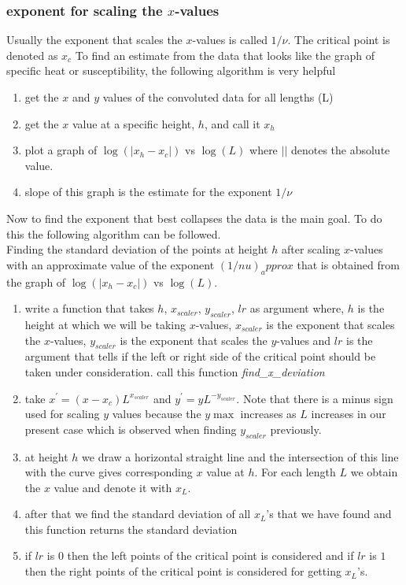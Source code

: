 		\subsubsection{exponent for scaling the $x$-values}
		Usually the exponent that scales the $x$-values is called $1/\nu$. The critical point is denoted as $x_c$
		To find an estimate from the data that looks like the graph of specific heat or susceptibility, the following algorithm is very helpful
		\begin{enumerate}
			\item get the $x$ and $y$ values of the convoluted data for all lengths (L)
			\item get the $x$ value at a specific height, $h$, and call it $x_h$
			\item plot a graph of $\log( \left|x_h - x_c\right| )$ vs $\log(L)$ where $\left|\right|$ denotes the absolute value.
			\item slope of this graph is the estimate for the exponent $1/\nu$
		\end{enumerate}
		Now to find the exponent that best collapses the data is the main goal. To do this the following algorithm can be followed.\\
		Finding the standard deviation of the points at height $h$ after scaling $x$-values with an approximate value of the exponent $(1/nu)_approx$ that is obtained from the graph of $\log( \left|x_h - x_c\right| )$ vs $\log(L)$.
		\begin{enumerate}
			\item write a function that takes $h$, $x_{scaler}$, $y_{scaler}$, $lr$ as argument where, $h$ is the height at which we will be taking $x$-values, $x_{scaler}$ is the exponent that scales the $x$-values, $y_{scaler}$ is the exponent that scales the $y$-values and $lr$ is the argument that tells if the left or right side of the critical point should be taken under consideration. call this function \textit{find\_x\_deviation}
			\item take $x^\prime = (x-x_c) L^{x_{scaler}}$ and $y^\prime = y L^{-y_{scaler}}$. Note that there is a minus sign used for scaling $y$ values because the $y\max$ increases as $L$ increases in our present case which is observed when finding $y_{scaler}$ previously.
			\item at height $h$ we draw a horizontal straight line and the intersection of this line with the curve gives corresponding $x$ value at $h$. For each length $L$ we obtain the $x$ value and denote it with $x_L$.
			\item after that we find the standard deviation of all $x_L$'s that we have found and this function returns the standard deviation
			\item if $lr$ is $0$ then the left points of the critical point is considered and if $lr$ is $1$ then the right points of the critical point is considered for getting $x_L$'s.
		\end{enumerate}
